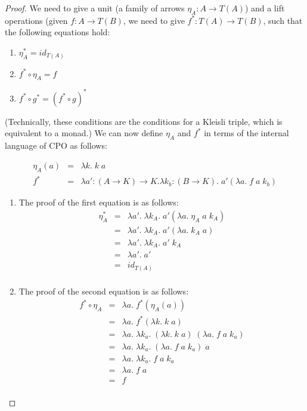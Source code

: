 \begin{proof}
We need to give a unit (a family of arrows $\eta_A : A \to T(A)$) and a lift
operations (given $f : A \to T(B)$, we need to give $f^* : T(A) \to T(B)$, 
such that the following equations hold:
\begin{enumerate}
\item $\eta_A^* = id_{T(A)}$
\item $f^* \circ \eta_A = f$ 
\item $f^* \circ g^* = (f^* \circ g)^*$
\end{enumerate}
(Technically, these conditions are the conditions for a Kleisli
triple, which is equivalent to a monad.)  We can now define $\eta_A$
and $f^*$ in terms of the internal language of CPO as follows:

\begin{displaymath}
  \begin{array}{lcl}
    \eta_A(a) & = & \lambda k.\; k\;a \\
    f^*       & = & \lambda a' : (A \to K) \to K. \lambda k_b : (B \to K).\;
                         a' (\lambda a.\; f\;a\;k_b)
  \end{array}
\end{displaymath}

\begin{enumerate}
\item The proof of the first equation is as follows: 
  \begin{displaymath}
    \begin{array}{lcl}
      \eta_A^* 
        & = & \lambda a'.\;\lambda k_{A}.\; 
                 a'(\lambda a.\; \eta_A\;a\;k_{A}) \\ 
        & = & \lambda a'.\;\lambda k_{A}.\; 
                 a'(\lambda a.\; k_A\;a) \\ 
        & = & \lambda a'.\;\lambda k_{A}.\; a'\;k_A \\
        & = & \lambda a'.\;a' \\
        & = & id_{T(A)} \\
    \end{array}
  \end{displaymath}

\item The proof of the second equation is as follows: 
  \begin{displaymath}
    \begin{array}{lcl}
      f^* \circ \eta_A 
        & = & \lambda a.\; f^*(\eta_A(a)) \\
        & = & \lambda a.\; f^*(\lambda k.\;k\;a) \\
        & = & \lambda a.\; \lambda k_a.\; 
                (\lambda k.\;k\;a)\;(\lambda a.\;f\;a\;k_a) \\
        & = & \lambda a.\;\lambda k_a.\;
                  (\lambda a.\;f\;a\;k_a)\;a \\
        & = & \lambda a.\;\lambda k_a.\; f\;a\;k_a \\
        & = & \lambda a.\; f\;a \\
        & = & f \\                       
    \end{array}
  \end{displaymath}


\end{enumerate}
\end{proof}
